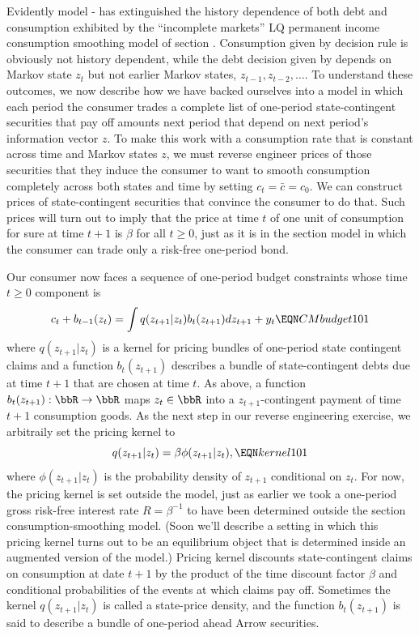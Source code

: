 %
%
%
Evidently model - has extinguished the history dependence of both debt and consumption exhibited by 
the ``incomplete markets'' LQ permanent income consumption smoothing model of section .  Consumption given by decision rule
  is obviously not history dependent, while the debt decision given by  depends on Markov state $z_t$ but not earlier 
Markov states, $z_{t-1}, z_{t-2}, \ldots$. To understand   these outcomes,  we now  describe  how  we have backed ourselves into  a model in which each period the consumer  trades a complete
list of one-period state-contingent securities that  pay off amounts next period that depend on next period's information vector $z$.
  To make this work with a consumption rate that is constant across time and Markov states $z$, we  must reverse engineer prices of those securities
  that they   induce the consumer to want to smooth consumption completely
across both states and time by setting $c_t = \bar c = c_0$.
We can construct   prices of state-contingent securities that convince the consumer to do that.
Such  prices will turn out to  imply that the price at time $t$ of one unit of consumption for sure at time $t+1$ is $\beta$ for all $t \geq 0$, just as it is in the section   model  in which
the consumer can trade only a risk-free one-period bond.


Our consumer now faces a sequence of one-period budget constraints whose time $t \geq 0$ component is
$$ c_t + b_{t-1}(z_t) = \int  q(z_{t+1} | z_t ) b_t(z_{t+1}) d z_{t+1} + y_t  \EQN CMbudget101 $$
where $q(z_{t+1} | z_t)$ is a  kernel for pricing bundles of  one-period  state contingent claims and a function  $b_t(z_{t+1})$ describes    a bundle of state-contingent debts due at time $t+1$ 
 that are chosen at time $t$.  As above, a function  $b_t(z_{t+1}): \bbR \rightarrow \bbR$ maps $z_{t} \in 
 \bbR$ into a $z_{t+1}$-contingent payment of time $t+1$ consumption goods.
As the next step in our reverse engineering exercise, we  
arbitraily set the pricing kernel to
$$ q(z_{t+1} | z_t ) = \beta \phi(z_{t+1} | z_t) , \EQN kernel101 $$
where $\phi(z_{t+1} | z_t)$ is the probability density of $z_{t+1}$ conditional on $z_t$. For now,
the pricing kernel is set outside  the model, just 
as earlier we took a one-period gross risk-free interest rate $R = \beta^{-1}$ to have been determined outside the section   consumption-smoothing model. (Soon we'll describe a setting in which this pricing kernel turns out to be an equilibrium object that is determined inside an augmented version of the model.) Pricing kernel  discounts state-contingent claims on consumption at date $t+1$ by the product of the time  discount factor $\beta$ and  conditional probabilities of  the  events
at which  claims pay off. 
Sometimes the kernel $q(z_{t+1} | z_t)$ is called  a state-price density,
and the function $b_t(z_{t+1})$ is said to describe a bundle of one-period ahead Arrow securities.


